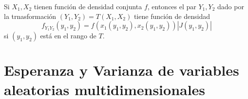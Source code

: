 \begin{cor}
Si $X_1,X_2$ tienen función de densidad conjunta $f$, entonces el par $Y_1,Y_2$ dado por la trnasformación $(Y_1,Y_2) = T(X_1,X_2)$ tiene función de densidad \[ f_{Y_1Y_2}(y_1,y_2) = f(x_1(y_1,y_2),x_2(y_1,y_2))|J(y_1,y_2)| \] si $(y_1,y_2)$ está en el rango de $T$.
\end{cor}

\begin{ejr}

\end{ejr}

\begin{ejr}

\end{ejr}

\begin{ejr}

\end{ejr}

\begin{ejr}

\end{ejr}

\begin{ejr}

\end{ejr}

\begin{ejr}

\end{ejr}

\begin{ejr}

\end{ejr}

\begin{ejr}

\end{ejr}

\begin{ejr}

\end{ejr}

\begin{ejr}

\end{ejr}

\section{Esperanza y Varianza de variables aleatorias multidimensionales}

